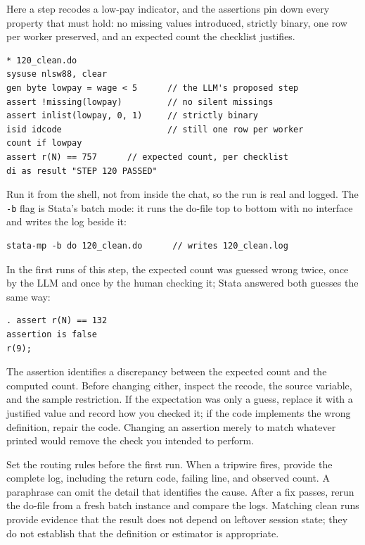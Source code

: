 \documentclass[
    a4paper,
    fontsize=10pt,
    twoside=true,
    numbers=noenddot,
]{kaobook}
\begin{document}
Here a step recodes a low-pay indicator, and the assertions pin down every property that must hold: no missing values introduced, strictly binary, one row per worker preserved, and an expected count the checklist justifies.
\par
{\footnotesize
\begin{verbatim}
* 120_clean.do
sysuse nlsw88, clear
gen byte lowpay = wage < 5      // the LLM's proposed step
assert !missing(lowpay)         // no silent missings
assert inlist(lowpay, 0, 1)     // strictly binary
isid idcode                     // still one row per worker
count if lowpay
assert r(N) == 757      // expected count, per checklist
di as result "STEP 120 PASSED"
\end{verbatim}
}
Run it from the shell, not from inside the chat, so the run is real and logged. The \texttt{-b} flag is Stata's batch mode: it runs the do-file top to bottom with no interface and writes the log beside it:
\par
{\footnotesize
\begin{verbatim}
stata-mp -b do 120_clean.do      // writes 120_clean.log
\end{verbatim}
}
In the first runs of this step, the expected count was guessed wrong twice, once by the LLM and once by the human checking it; Stata answered both guesses the same way:
\par
{\footnotesize
\begin{verbatim}
. assert r(N) == 132
assertion is false
r(9);
\end{verbatim}
}
The assertion identifies a discrepancy between the expected count and the computed count. Before changing either, inspect the recode, the source variable, and the sample restriction. If the expectation was only a guess, replace it with a justified value and record how you checked it; if the code implements the wrong definition, repair the code. Changing an assertion merely to match whatever printed would remove the check you intended to perform.

Set the routing rules before the first run. When a tripwire fires, provide the complete log, including the return code, failing line, and observed count. A paraphrase can omit the detail that identifies the cause. After a fix passes, rerun the do-file from a fresh batch instance and compare the logs. Matching clean runs provide evidence that the result does not depend on leftover session state; they do not establish that the definition or estimator is appropriate.
\end{document}
